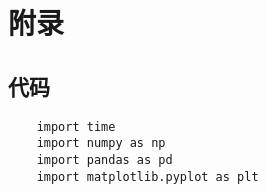 \documentclass[UTF8]{ctexart}
\begin{document}
\clearpage

\clearpage

\section{附录}
\subsection{代码}

\lstset{language=python}
\begin{lstlisting}
	import time
	import numpy as np
	import pandas as pd
	import matplotlib.pyplot as plt

		
\end{lstlisting}
\end{document}
